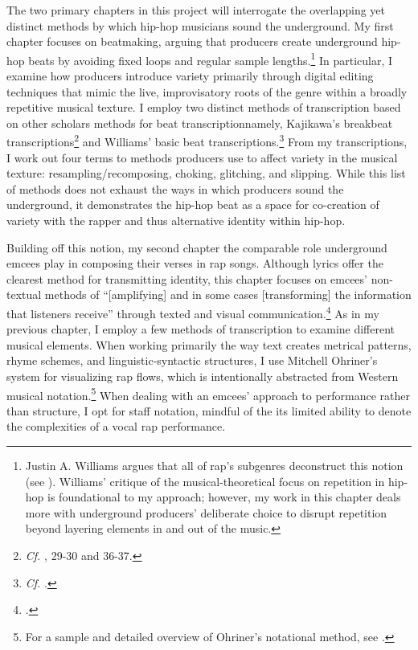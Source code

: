 The two primary chapters in this project will interrogate the overlapping yet distinct methods by which hip-hop
musicians sound the underground. My first chapter focuses on beatmaking, arguing that producers create underground
hip-hop beats by avoiding fixed loops and regular sample lengths.\footnote{
    Justin A. Williams argues that all of rap's subgenres deconstruct this notion (see \cite{justinawilliamsBeatsFlowsResponse2009}).
    Williams' critique of the musical-theoretical focus on repetition in hip-hop is foundational to my approach; however, my work
    in this chapter deals more with underground producers' deliberate choice to disrupt repetition beyond layering elements in and
    out of the music.} 
In particular, I examine how producers introduce variety primarily through digital editing techniques that mimic 
the live, improvisatory roots of the genre within a broadly repetitive musical texture. I employ two distinct methods of
transcription based on other scholars methods for beat transcription\textemdash namely, Kajikawa's breakbeat 
transcriptions\footnote{
    \textit{Cf.} \autocite[29--30 and 36--37]{lorenkajikawaSoundingRaceRap2015}, 29-30  and 36-37.} 
and Williams' basic beat transcriptions.\footnote{
    \textit{Cf.} \autocite[61ff]{justinawilliamsRhyminStealinMusical2013}.} 
From my transcriptions, I work out four terms to methods producers use to affect variety in the musical texture: 
resampling/recomposing, choking, glitching, and slipping. While this list of methods does not exhaust the ways in which
producers sound the underground, it demonstrates the hip-hop beat as a space for co-creation of variety with the rapper
and thus alternative identity within hip-hop.

Building off this notion, my second chapter the comparable role underground emcees play in composing their verses in rap
songs. Although lyrics offer the clearest method for transmitting identity, this chapter focuses on emcees' non-textual 
methods of ``[amplifying] and in some cases [transforming] the information that listeners receive'' through texted and visual
communication.\footnote{
    \autocite[12]{lorenkajikawaSoundingRaceRap2015}.} 
As in my previous chapter, I employ a few methods of transcription to examine different musical elements. When working primarily
the way text creates metrical patterns, rhyme schemes, and linguistic-syntactic structures, I use Mitchell Ohriner's system for
visualizing rap flows, which is intentionally abstracted from Western musical notation.\footnote{
    For a sample and detailed overview of Ohriner's notational method, see \autocite[xxvii--xl]{mitchellohrinerFlowRhythmicVoice2019}.}
When dealing with an emcees' approach to performance rather than structure, I opt for staff notation, mindful of the its limited
ability to denote the complexities of a vocal rap performance. 
    